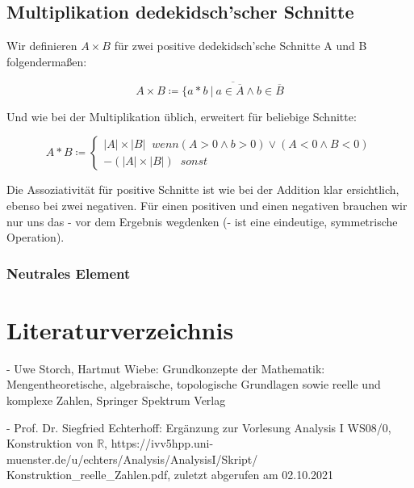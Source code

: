 \documentclass[12pt]{article}
\begin{document}
    \subsection{Multiplikation dedekidsch'scher Schnitte}

    Wir definieren $A \times B$ für zwei positive dedekidsch'sche Schnitte A und B folgendermaßen:

    \[A \times B \coloneqq \overline{\{a * b \mspace{4mu} | \mspace{4mu} a \in \overline{A} \land b \in \overline{B}}\]

    Und wie bei der Multiplikation üblich, erweitert für beliebige Schnitte:

    \[
        A * B \coloneqq \begin{cases}
            |A| \times |B| \mspace{10mu} wenn (A > 0 \land b > 0) \lor (A < 0 \land B < 0) \\
            -(|A| \times |B|) \mspace{10mu} sonst
        \end{cases}
    \]

    Die Assoziativität für positive Schnitte ist wie bei der Addition klar ersichtlich, ebenso bei zwei negativen.
    Für einen positiven und einen negativen brauchen wir nur uns das - vor dem Ergebnis wegdenken
    (- ist eine eindeutige, symmetrische Operation).

    \subsubsection{Neutrales Element}


    \newpage

    \appendix

    \newpage

    \section{Literaturverzeichnis}

    - Uwe Storch, Hartmut Wiebe: Grundkonzepte der Mathematik: Mengentheoretische, algebraische, topologische Grundlagen
    sowie reelle und komplexe Zahlen, Springer Spektrum Verlag

    - Prof. Dr. Siegfried Echterhoff: Ergänzung zur Vorlesung Analysis I WS08/0, Konstruktion von $\mathbb{R}$,
    https://ivv5hpp.uni-muenster.de/u/echters/Analysis/AnalysisI/Skript/
    Konstruktion\_reelle\_Zahlen.pdf, zuletzt abgerufen am 02.10.2021

    \newpage
\end{document}
